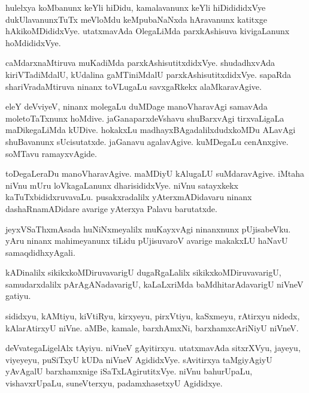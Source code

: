\documentclass{article}
\begin{document}
\begin{mn}
hulelxya  koMbanunx  keYli  hiDidu,  kamalavanunx  keYli  hiDidididxVye  
dukUlavanunxTuTx  meVloMdu  keMpubaNaNxda  hAravanunx  katitxge  hAkikoMDididxVye.  
utatxmavAda  OlegaLiMda  parxkAshisuva  kivigaLanunx  hoMdididxVye.
\end{mn}

\begin{mn}
caMdarxnaMtiruva  muKadiMda  parxkAshisutitxdidxVye.  shudadhxvAda  kiriVTadiMdalU,  
kUdalina  gaMTiniMdalU  parxkAshisutitxdidxVye.  sapaRda  shariVradaMtiruva  ninanx  
toVLugaLu  savxgaRkekx  alaMkaravAgive.
\end{mn}

\begin{mn}
eleY  deVviyeV,  ninanx  molegaLu  duMDage  manoVharavAgi  samavAda  moletoTaTxnunx  
hoMdive.  jaGanaparxdeVshavu  shuBarxvAgi  tirxvaLigaLa  maDikegaLiMda  kUDive.  
hokakxLu  madhayxBAgadalilxdudxkoMDu  ALavAgi  shuBavanunx  sUcisutatxde.  
jaGanavu  agalavAgive.  kuMDegaLu  cenAnxgive.  soMTavu  ramayxvAgide.
\end{mn}

\begin{mn}
toDegaLeraDu  manoVharavAgive.  maMDiyU  kAlugaLU  suMdaravAgive.  iMtaha  niVnu  mUru  
loVkagaLanunx  dharisididxVye.  niVnu  satayxkekx kaTuTxbididxruvavaLu.  pusakxradalilx  
yAterxmADidavaru  ninanx dashaRnamADidare  avarige  yAterxya  Palavu  barutatxde.
\end{mn}

\begin{mn}
jeyxVSaThxmAsada  huNiNxmeyalilx  muKayxvAgi  ninanxnunx  pUjisabeVku.  yAru  ninanx  
mahimeyanunx  tiLidu  pUjisuvaroV  avarige  makakxLU  haNavU  samaqdidhxyAgali.
\end{mn}

\begin{mn}
kADinalilx  sikikxkoMDiruvavarigU  dugaRgaLalilx  sikikxkoMDiruvavarigU,  
samudarxdalilx  pArAgANadavarigU,  kaLaLxriMda  baMdhitarAdavarigU  niVneV gatiyu.
\end{mn}

\begin{mn}
sididxyu,  kAMtiyu,  kiVtiRyu,  kirxyeyu,  pirxVtiyu,  kaSxmeyu,  rAtirxyu  nidedx,  
kAlarAtirxyU  niVne.  aMBe,  kamale,  barxhAmxNi,  barxhamxcAriNiyU  niVneV.
\end{mn}

\begin{mn}
deVvategaLigelAlx  tAyiyu.  niVneV  gAyitirxyu.  utatxmavAda  sitxrXVyu,  
jayeyu,  viyeyeyu,  puSiTxyU  kUDa  niVneV  AgididxVye.  sAvitirxya  
taMgiyAgiyU  yAvAgalU  barxhamxnige  iSaTxLAgirutitxVye.  niVnu  bahurUpaLu,  
vishavxrUpaLu,  suneVterxyu,  padamxhasetxyU  Agididxye.
\end{mn}
\end{document}
